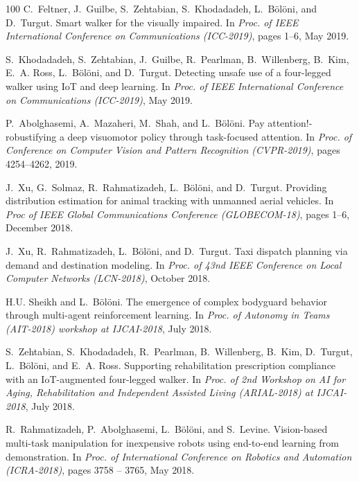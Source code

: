 \begin{thebibliography}{100}
C.~Feltner, J.~Guilbe, S.~Zehtabian, S.~Khodadadeh, L.~Bölöni, and D.~Turgut.
\newblock Smart walker for the visually impaired.
\newblock In {\em Proc. of IEEE International Conference on Communications
  (ICC-2019)}, pages 1--6, May 2019.

S.~Khodadadeh, S.~Zehtabian, J.~Guilbe, R.~Pearlman, B.~Willenberg, B.~Kim,
  E.~A. Ross, L.~Bölöni, and D.~Turgut.
\newblock Detecting unsafe use of a four-legged walker using {IoT} and deep
  learning.
\newblock In {\em Proc. of IEEE International Conference on Communications
  (ICC-2019)}, May 2019.

P.~Abolghasemi, A.~Mazaheri, M.~Shah, and L.~Bölöni.
\newblock Pay attention!-robustifying a deep visuomotor policy through
  task-focused attention.
\newblock In {\em Proc. of Conference on Computer Vision and Pattern
  Recognition (CVPR-2019)}, pages 4254--4262, 2019.

J.~Xu, G.~Solmaz, R.~Rahmatizadeh, L.~Bölöni, and D.~Turgut.
\newblock Providing distribution estimation for animal tracking with unmanned
  aerial vehicles.
\newblock In {\em Proc of {IEEE} Global Communications Conference
  (GLOBECOM-18)}, pages 1--6, December 2018.

J.~Xu, R.~Rahmatizadeh, L.~Bölöni, and D.~Turgut.
\newblock Taxi dispatch planning via demand and destination modeling.
\newblock In {\em Proc. of 43nd IEEE Conference on Local Computer Networks
  (LCN-2018)}, October 2018.

H.U. Sheikh and L.~Bölöni.
\newblock The emergence of complex bodyguard behavior through multi-agent
  reinforcement learning.
\newblock In {\em Proc. of Autonomy in Teams (AIT-2018) workshop at
  IJCAI-2018}, July 2018.

S.~Zehtabian, S.~Khodadadeh, R.~Pearlman, B.~Willenberg, B.~Kim, D.~Turgut,
  L.~Bölöni, and E.~A. Ross.
\newblock Supporting rehabilitation prescription compliance with an
  {IoT}-augmented four-legged walker.
\newblock In {\em Proc. of 2nd Workshop on AI for Aging, Rehabilitation and
  Independent Assisted Living (ARIAL-2018) at IJCAI-2018}, July 2018.

R.~Rahmatizadeh, P.~Abolghasemi, L.~Bölöni, and S.~Levine.
\newblock Vision-based multi-task manipulation for inexpensive robots using
  end-to-end learning from demonstration.
\newblock In {\em Proc. of International Conference on Robotics and Automation
  (ICRA-2018)}, pages 3758 -- 3765, May 2018.


\end{thebibliography}
